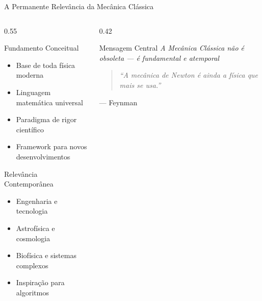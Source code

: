 \documentclass[aspectratio=169,12pt]{beamer}
\begin{document}
\begin{frame}{A Permanente Relevância da Mecânica Clássica}
    \begin{columns}[T]
        \begin{column}{0.55\textwidth}
            \begin{block}{Fundamento Conceitual}
                \begin{itemize}
                    \item Base de toda física moderna
                    \item Linguagem matemática universal
                    \item Paradigma de rigor científico
                    \item Framework para novos desenvolvimentos
                \end{itemize}
            \end{block}

            \begin{block}{Relevância Contemporânea}
                \begin{itemize}
                    \item Engenharia e tecnologia
                    \item Astrofísica e cosmologia
                    \item Biofísica e sistemas complexos
                    \item Inspiração para algoritmos
                \end{itemize}
            \end{block}
        \end{column}
        \begin{column}{0.42\textwidth}
            \begin{alertblock}{Mensagem Central}
                \textit{A Mecânica Clássica não é obsoleta --- é fundamental e atemporal}
            \end{alertblock}

            \vspace{0.5cm}

            \begin{quote}
                \small\itshape
                ``A mecânica de Newton é ainda a física que mais se usa.''
            \end{quote}
            \hfill --- Feynman
        \end{column}
    \end{columns}
\end{frame}
\end{document}
